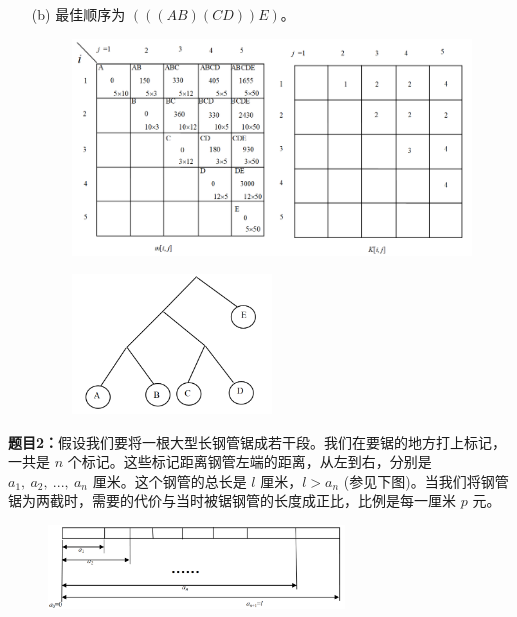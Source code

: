 \documentclass[12pt,a4paper]{article}
\begin{document}
\begin{CJK}{UTF8}{song}
\begin{enumerate}
	\item[(b)]  最佳顺序为 $(((AB)(CD))E)$。
	\begin{figure}[H]
	\centering %
	\includegraphics[width=1\textwidth]{1(1)} %
\end{figure}	
\begin{figure}[H]
	\centering %
	\includegraphics[width=0.5\textwidth]{1(2)} %
\end{figure}
\end{enumerate}

\vspace{5pt}
\noindent
{\bf 题目2：}假设我们要将一根大型长钢管锯成若干段。我们在要锯的地方打上标记，一共是 $n$ 个标记。这些标记距离钢管左端的距离，从左到右，分别是 $a_1,\ a_2,\  ...,\ a_n$ 厘米。这个钢管的总长是 $l$ 厘米，$l > a_n$ (参见下图)。当我们将钢管锯为两截时，需要的代价与当时被锯钢管的长度成正比，比例是每一厘米 $p$ 元。\\
\begin{figure}[H]
	\centering %
	\includegraphics[width=0.7\textwidth]{2} %
\end{figure}	


\end{CJK}
\end{document}

